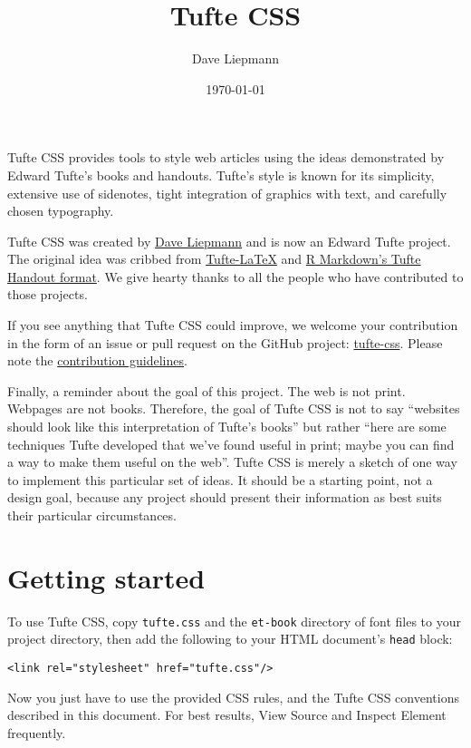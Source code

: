 \documentclass{article}
\title{Tufte CSS}
\author{Dave Liepmann}
\date{\today}
\begin{document}
\maketitle

Tufte CSS provides tools to style web articles using the ideas demonstrated by Edward Tufte’s books and handouts. Tufte’s style is known for its simplicity, extensive use of sidenotes, tight integration of graphics with text, and carefully chosen typography.

Tufte CSS was created by \href{https://www.daveliepmann.com}{Dave Liepmann} and is now an Edward Tufte project. The original idea was cribbed from \href{https://tufte-latex.github.io/tufte-latex/}{Tufte-LaTeX} and \href{https://bookdown.org/yihui/rmarkdown/tufte-handouts.html}{R Markdown’s Tufte Handout format}. We give hearty thanks to all the people who have contributed to those projects.

If you see anything that Tufte CSS could improve, we welcome your contribution in the form of an issue or pull request on the GitHub project: \href{https://github.com/edwardtufte/tufte-css}{tufte-css}. Please note the \href{https://github.com/edwardtufte/tufte-css\#contributing}{contribution guidelines}.

Finally, a reminder about the goal of this project. The web is not print. Webpages are not books. Therefore, the goal of Tufte CSS is not to say ``websites should look like this interpretation of Tufte’s books'' but rather ``here are some techniques Tufte developed that we’ve found useful in print; maybe you can find a way to make them useful on the web''. Tufte CSS is merely a sketch of one way to implement this particular set of ideas. It should be a starting point, not a design goal, because any project should present their information as best suits their particular circumstances.

\section{Getting started}
To use Tufte CSS, copy \texttt{tufte.css} and the \texttt{et-book} directory of font files to your project directory, then add the following to your HTML document’s \texttt{head} block:

\begin{verbatim}
<link rel="stylesheet" href="tufte.css"/>
\end{verbatim}

Now you just have to use the provided CSS rules, and the Tufte CSS conventions described in this document. For best results, View Source and Inspect Element frequently.
\end{document}
